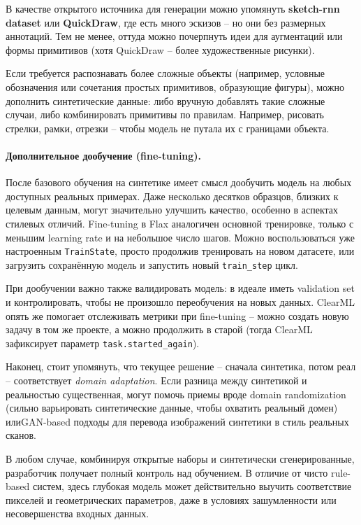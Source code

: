 \documentclass{article}
\begin{document}
В качестве открытого источника для генерации можно упомянуть \textbf{sketch-rnn dataset} или \textbf{QuickDraw}, где есть много эскизов – но они без размерных аннотаций. Тем не менее, оттуда можно почерпнуть идеи для аугментаций или формы примитивов (хотя QuickDraw – более художественные рисунки).

Если требуется распознавать более сложные объекты (например, условные обозначения или сочетания простых примитивов, образующие фигуры), можно дополнить синтетические данные: либо вручную добавлять такие сложные случаи, либо комбинировать примитивы по правилам. Например, рисовать стрелки, рамки, отрезки – чтобы модель не путала их с границами объекта.

\paragraph{Дополнительное дообучение (fine-tuning).} После базового обучения на синтетике имеет смысл дообучить модель на любых доступных реальных примерах. Даже несколько десятков образцов, близких к целевым данным, могут значительно улучшить качество, особенно в аспектах стилевых отличий. Fine-tuning в Flax аналогичен основной тренировке, только с меньшим learning rate и на небольшое число шагов. Можно воспользоваться уже настроенным \texttt{TrainState}, просто продолжив тренировать на новом датасете, или загрузить сохранённую модель и запустить новый \texttt{train_step} цикл.

При дообучении важно также валидировать модель: в идеале иметь validation set и контролировать, чтобы не произошло переобучения на новых данных. ClearML опять же помогает отслеживать метрики при fine-tuning – можно создать новую задачу в том же проекте, а можно продолжить в старой (тогда ClearML зафиксирует параметр \texttt{task.started_again}).

Наконец, стоит упомянуть, что текущее решение – сначала синтетика, потом реал – соответствует \textit{domain adaptation}. Если разница между синтетикой и реальностью существенная, могут помочь приемы вроде domain randomization (сильно варьировать синтетические данные, чтобы охватить реальный домен) илиGAN-based подходы для перевода изображений синтетики в стиль реальных сканов.

В любом случае, комбинируя открытые наборы и синтетически сгенерированные, разработчик получает полный контроль над обучением. В отличие от чисто rule-based систем, здесь глубокая модель может действительно выучить соответствие пикселей и геометрических параметров, даже в условиях зашумленности или несовершенства входных данных.
\end{document}
